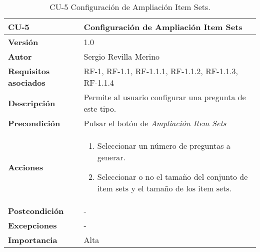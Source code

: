 \begin{table}[h]
	\centering
	\begin{tabularx}{\linewidth}{ p{} p{} }
		\toprule
		\textbf{CU-5}    & \textbf{Configuración de Ampliación Item Sets}\\
		\toprule
		\textbf{Versión}              & 1.0    \\
		\textbf{Autor}                & Sergio Revilla Merino \\
		\textbf{Requisitos asociados} & RF-1, RF-1.1, RF-1.1.1, RF-1.1.2, RF-1.1.3, RF-1.1.4 \\
		\textbf{Descripción}          & Permite al usuario configurar una pregunta de este tipo.  \\
		\textbf{Precondición}         & Pulsar el botón de \textit{Ampliación Item Sets} \\
		\textbf{Acciones}             &
		\begin{enumerate}
			\def\labelenumi{\arabic{enumi}.}
			\tightlist
			\item Seleccionar un número de preguntas a generar.
            \item Seleccionar o no el tamaño del conjunto de item sets y el tamaño de los item sets.
		\end{enumerate} \\
		\textbf{Postcondición}        & - \\
		\textbf{Excepciones}          & - \\
		\textbf{Importancia}          & Alta \\
		\bottomrule
	\end{tabularx}
	\caption{CU-5 Configuración de Ampliación Item Sets.}
\end{table}

